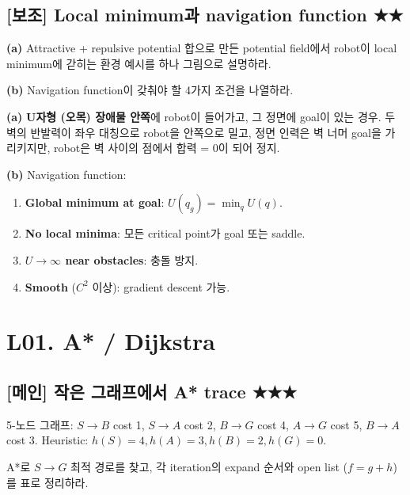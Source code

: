 \documentclass[11pt,a4paper]{article}
\begin{document}
\subsection*{[보조] Local minimum과 navigation function \hfill ★★}

\begin{prob}
\textbf{(a)} Attractive + repulsive potential 합으로 만든 potential field에서 robot이 local minimum에 갇히는 환경 예시를 하나 그림으로 설명하라.

\textbf{(b)} Navigation function이 갖춰야 할 4가지 조건을 나열하라.
\end{prob}

\begin{sol}
\textbf{(a)} \textbf{U자형 (오목) 장애물 안쪽}에 robot이 들어가고, 그 정면에 goal이 있는 경우. 두 벽의 반발력이 좌우 대칭으로 robot을 안쪽으로 밀고, 정면 인력은 벽 너머 goal을 가리키지만, robot은 벽 사이의 점에서 합력 = 0이 되어 정지.

\textbf{(b)} Navigation function:
\begin{enumerate}
  \item \textbf{Global minimum at goal}: $U(q_g) = \min_q U(q)$.
  \item \textbf{No local minima}: 모든 critical point가 goal 또는 saddle.
  \item \textbf{$U \to \infty$ near obstacles}: 충돌 방지.
  \item \textbf{Smooth} ($C^2$ 이상): gradient descent 가능.
\end{enumerate}
\end{sol}

\section{L01. A* / Dijkstra}

\subsection*{[메인] 작은 그래프에서 A* trace \hfill ★★★}

\begin{prob}
5-노드 그래프: $S \to B$ cost 1, $S \to A$ cost 2, $B \to G$ cost 4, $A \to G$ cost 5, $B \to A$ cost 3. Heuristic: $h(S) = 4, h(A) = 3, h(B) = 2, h(G) = 0$.

A*로 $S \to G$ 최적 경로를 찾고, 각 iteration의 expand 순서와 open list ($f = g + h$)를 표로 정리하라.
\end{prob}
\end{document}
